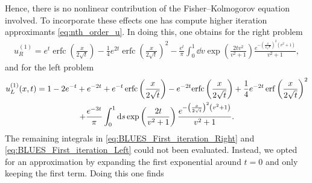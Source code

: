 \documentclass[amsmath,amssymb,amsfonts,aps,pre,preprint,superscriptaddress,bibnotes,showpacs,showkeys,longbibliography]{revtex4-1}
\DeclareMathOperator{\erfc}{erfc}
\begin{document}
Hence, there is no nonlinear contribution of the Fisher–Kolmogorov equation involved. To incorporate these effects one has compute higher iteration approximants \eqref{eq:nth_order_u}. In doing this, one obtains for the right problem
\begin{multline}\label{eq:BLUES_First_iteration_Right}
    u^{(1)}_R =e^t \erfc\left(\frac{x}{2 \sqrt{t}}\right)-\frac{1}{4} e^{2 t} \erfc\left(\frac{x}{2 \sqrt{t}}\right)^2
    - \frac{e^t}{\pi}\int_0^1 \dd{v}\exp \left(\frac{2 t v^2}{v^2+1}\right)
    \frac{ e^{-\left(\frac{x}{2 \sqrt{t}}\right)^2\left(v^2+1\right) }}{v^2+1},
\end{multline}
and for the left problem
\begin{multline}\label{eq:BLUES_First_iteration_Left}
    u^{(1)}_L(x,t) =1-2 e^{-t}+e^{-2 t}+e^{-t} \erfc\left(\frac{x}{2 \sqrt{t}}\right)-e^{-2 t} \text{erfc}\left(\frac{x}{2 \sqrt{t}}\right)+\frac{1}{4} e^{-2 t} \erf\left(\frac{x}{2 \sqrt{t}}\right)^2
    \\+\frac{e^{-3 t}}{\pi } \int_0^1 \dd{s}\exp \left(\frac{2 t}{v^2+1}\right)\frac{ e^{-\left(\frac{x}{2 \sqrt{t}}\right)^2\left(v^2+1\right) }}{v^2+1}.
\end{multline} %
 The remaining integrals in \eqref{eq:BLUES_First_iteration_Right} and \eqref{eq:BLUES_First_iteration_Left} could not been evaluated. Instead, we opted for an approximation by expanding the first exponential around $t=0$ and only keeping the first term. Doing this one finds
\end{document}

